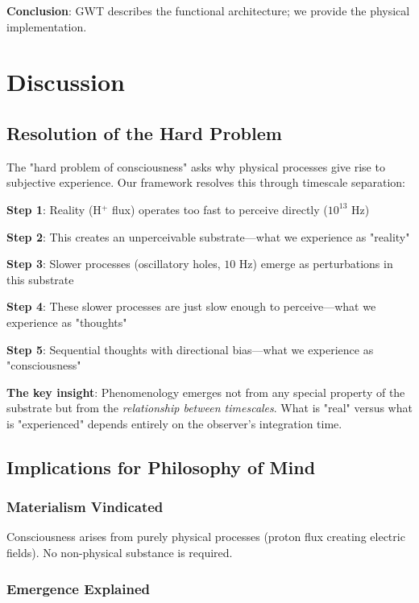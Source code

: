 \documentclass[12pt,a4paper]{article}
\begin{document}
\textbf{Conclusion}: GWT describes the functional architecture; we provide the physical implementation.

\section{Discussion}

\subsection{Resolution of the Hard Problem}

The "hard problem of consciousness" asks why physical processes give rise to subjective experience. Our framework resolves this through timescale separation:

\textbf{Step 1}: Reality (H$^+$ flux) operates too fast to perceive directly ($10^{13}$ Hz)

\textbf{Step 2}: This creates an unperceivable substrate—what we experience as "reality"

\textbf{Step 3}: Slower processes (oscillatory holes, $10$ Hz) emerge as perturbations in this substrate

\textbf{Step 4}: These slower processes are just slow enough to perceive—what we experience as "thoughts"

\textbf{Step 5}: Sequential thoughts with directional bias—what we experience as "consciousness"

\textbf{The key insight}: Phenomenology emerges not from any special property of the substrate but from the \textit{relationship between timescales}. What is "real" versus what is "experienced" depends entirely on the observer's integration time.

\subsection{Implications for Philosophy of Mind}

\subsubsection{Materialism Vindicated}

Consciousness arises from purely physical processes (proton flux creating electric fields). No non-physical substance is required.

\subsubsection{Emergence Explained}
\end{document}
